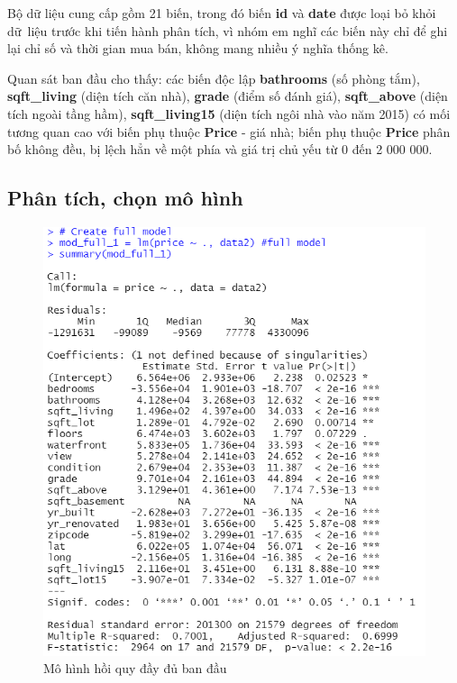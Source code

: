 Bộ dữ liệu cung cấp gồm 21 biến, trong đó biến \textbf{id} và \textbf{date} được loại bỏ khỏi dữ~liệu trước khi tiến hành phân tích, vì nhóm em nghĩ các biến này chỉ để ghi lại chỉ số và thời gian mua bán, không mang nhiều ý nghĩa thống kê. 

Quan sát ban đầu cho thấy: các biến độc lập \textbf{bathrooms} (số phòng tắm), \textbf{sqft\_living} (diện tích căn nhà), \textbf{grade} (điểm số đánh giá), \textbf{sqft\_above} (diện tích ngoài tầng hầm), \textbf{sqft\_living15} (diện tích ngôi nhà vào năm 2015) có mối tương quan cao với biến phụ thuộc \textbf{Price} - giá nhà; biến phụ thuộc \textbf{Price} phân bố không đều, bị lệch hẳn về một phía và giá trị chủ yếu từ 0 đến 2 000 000.
\subsection*{Phân tích, chọn mô hình}

\begin{figure}[H]
	\centering
	\includegraphics[width=.7\linewidth]{../Photo Of Result/B2_originalmodel_R}
	\caption{Mô hình hồi quy đầy đủ ban đầu}
	\label{B2_full}
\end{figure}

